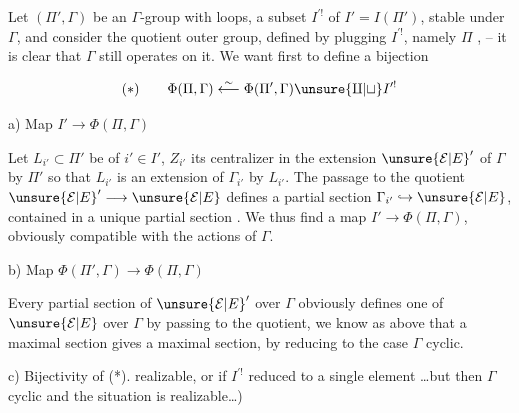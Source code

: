 Let  $(\Pi',\Gamma)$ be an  $\Gamma$-group
with loops,   a subset
$I^{\prime!}$ of $I'=I(\Pi')$, stable under $\Gamma$,
and consider the quotient outer group, defined by plugging $I^{\prime!}$,
namely $\Pi$ , -- it is clear that $\Gamma$ still operates on it.
We want first to define a bijection

\[
(*)\qquad\Phi(\Pi,\Gamma)\overset{\sim}{\longleftarrow}
\Phi(\Pi',\Gamma)\unsure{\amalg|\sqcup} I^{\prime!}
\]

a) Map $I'\longrightarrow\Phi(\Pi,\Gamma)$

Let $L_{i'}\subset\Pi'$ be of  $i'\in I'$, $Z_{i'}$ its centralizer in the extension $\unsure{\mathcal E|E}'$ of $\Gamma$ by $\Pi'$
so that $L_{i'}$ is an extension of $\Gamma_{i'}$
by $L_{i'}$. The passage to the quotient $\unsure{\mathcal E|E}'\longrightarrow\unsure{\mathcal E|E}$
defines a partial section $\Gamma_{i'}\hookrightarrow\unsure{\mathcal E|E}$,
contained in a unique  partial section
.
We thus find a map $I'\longrightarrow\Phi(\Pi,\Gamma)$,
obviously compatible with the actions of $\Gamma$.

b) Map $\Phi(\Pi',\Gamma)\longrightarrow\Phi(\Pi,\Gamma)$

Every partial section  of $\unsure{\mathcal E|E}'$ over $\Gamma$ obviously defines
one of $\unsure{\mathcal E|E}$ over $\Gamma$ by passing to the
quotient, we know as above that a
maximal section gives a maximal section,
by reducing to the case $\Gamma$ cyclic.

c) Bijectivity of (*).  
realizable, or if $I^{\prime!}$ reduced to a single element
\ldots but then $\Gamma$ cyclic and the situation is realizable\ldots)